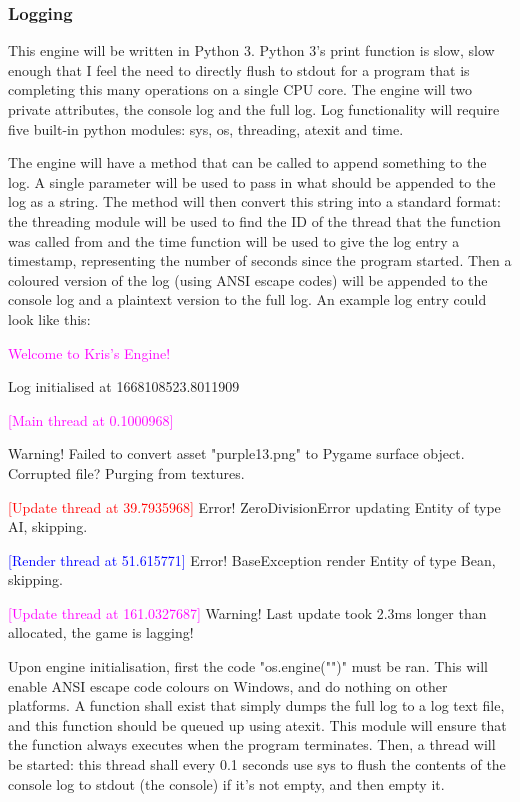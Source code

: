 \documentclass{report}
\begin{document}
\subsubsection{Logging}

This engine will be written in Python 3. Python 3's print function is slow, slow enough that I feel the need to directly flush to stdout for a program that is completing this many operations on a single CPU core. The engine will two private attributes, the console log and the full log. Log functionality will require five built-in python modules: sys, os, threading, atexit and time. 

The engine will have a method that can be called to append something to the log. A single parameter will be used to pass in what should be appended to the log as a string. The method will then convert this string into a standard format: the threading module will be used to find the ID of the thread that the function was called from and the time function will be used to give the log entry a timestamp, representing the number of seconds since the program started. Then a coloured version of the log (using ANSI escape codes) will be appended to the console log and a plaintext version to the full log. An example log entry could look like this:

\vspace{0.5cm}

\textcolor{magenta}{Welcome to Kris's Engine!}

Log initialised at 1668108523.8011909

\textcolor{magenta}{[Main thread at 0.1000968]}

Warning! Failed to convert asset "purple13.png" to Pygame surface object. Corrupted file? Purging from textures.

\textcolor{red}{[Update thread at 39.7935968]} Error! ZeroDivisionError updating Entity of type AI, skipping.

\textcolor{blue}{[Render thread at 51.615771]} Error! BaseException render Entity of type Bean, skipping.

\textcolor{magenta}{[Update thread at 161.0327687]} Warning! Last update took 2.3ms longer than allocated, the game is lagging!

\vspace{0.5cm}

Upon engine initialisation, first the code "os.engine("")" must be ran. This will enable ANSI escape code colours on Windows, and do nothing on other platforms. A function shall exist that simply dumps the full log to a log text file, and this function should be queued up using atexit. This module will ensure that the function always executes when the program terminates. Then, a thread will be started: this thread shall every 0.1 seconds use sys to flush the contents of the console log to stdout (the console) if it's not empty, and then empty it.
\end{document}
